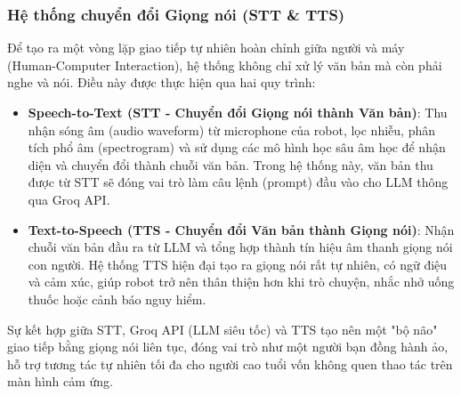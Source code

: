 \begin{table}[h!]
\centering
{}
\label{tab:prompting_techniques}
\end{table}


\subsubsection{Hệ thống chuyển đổi Giọng nói (STT \& TTS)}

Để tạo ra một vòng lặp giao tiếp tự nhiên hoàn chỉnh giữa người và máy (Human-Computer Interaction), hệ thống không chỉ xử lý văn bản mà còn phải nghe và nói. Điều này được thực hiện qua hai quy trình:

\begin{itemize}
    \item \textbf{Speech-to-Text (STT - Chuyển đổi Giọng nói thành Văn bản)}: Thu nhận sóng âm (audio waveform) từ microphone của robot, lọc nhiễu, phân tích phổ âm (spectrogram) và sử dụng các mô hình học sâu âm học để nhận diện và chuyển đổi thành chuỗi văn bản. Trong hệ thống này, văn bản thu được từ STT sẽ đóng vai trò làm câu lệnh (prompt) đầu vào cho LLM thông qua Groq API.
    \item \textbf{Text-to-Speech (TTS - Chuyển đổi Văn bản thành Giọng nói)}: Nhận chuỗi văn bản đầu ra từ LLM và tổng hợp thành tín hiệu âm thanh giọng nói con người. Hệ thống TTS hiện đại tạo ra giọng nói rất tự nhiên, có ngữ điệu và cảm xúc, giúp robot trở nên thân thiện hơn khi trò chuyện, nhắc nhở uống thuốc hoặc cảnh báo nguy hiểm.
\end{itemize}

Sự kết hợp giữa STT, Groq API (LLM siêu tốc) và TTS tạo nên một "bộ não" giao tiếp bằng giọng nói liên tục, đóng vai trò như một người bạn đồng hành ảo, hỗ trợ tương tác tự nhiên tối đa cho người cao tuổi vốn không quen thao tác trên màn hình cảm ứng.


